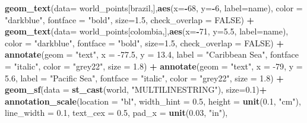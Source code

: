 \documentclass[12pt,twoside]{reedthesis}
\newenvironment{Shaded}{\begin{snugshade}}{\end{snugshade}}
\newcommand{\DataTypeTok}[1]{\textcolor[rgb]{0.13,0.29,0.53}{#1}}
\newcommand{\DecValTok}[1]{\textcolor[rgb]{0.00,0.00,0.81}{#1}}
\newcommand{\FloatTok}[1]{\textcolor[rgb]{0.00,0.00,0.81}{#1}}
\newcommand{\KeywordTok}[1]{\textcolor[rgb]{0.13,0.29,0.53}{\textbf{#1}}}
\newcommand{\NormalTok}[1]{#1}
\newcommand{\OperatorTok}[1]{\textcolor[rgb]{0.81,0.36,0.00}{\textbf{#1}}}
\newcommand{\OtherTok}[1]{\textcolor[rgb]{0.56,0.35,0.01}{#1}}
\newcommand{\StringTok}[1]{\textcolor[rgb]{0.31,0.60,0.02}{#1}}
\begin{document}
\begin{Shaded}
\begin{Highlighting}[]
\StringTok{  }\KeywordTok{geom_text}\NormalTok{(}\DataTypeTok{data=}\NormalTok{ world_points[brazil,],}\KeywordTok{aes}\NormalTok{(}\DataTypeTok{x=}\OperatorTok{-}\DecValTok{68}\NormalTok{, }\DataTypeTok{y=}\OperatorTok{-}\DecValTok{6}\NormalTok{, }\DataTypeTok{label=}\NormalTok{name), }\DataTypeTok{color =} \StringTok{"darkblue"}\NormalTok{, }\DataTypeTok{fontface =} \StringTok{"bold"}\NormalTok{, }\DataTypeTok{size=}\FloatTok{1.5}\NormalTok{, }\DataTypeTok{check_overlap =} \OtherTok{FALSE}\NormalTok{) }\OperatorTok{+}
\StringTok{  }\KeywordTok{geom_text}\NormalTok{(}\DataTypeTok{data=}\NormalTok{ world_points[colombia,],}\KeywordTok{aes}\NormalTok{(}\DataTypeTok{x=}\OperatorTok{-}\DecValTok{71}\NormalTok{, }\DataTypeTok{y=}\FloatTok{5.5}\NormalTok{, }\DataTypeTok{label=}\NormalTok{name), }\DataTypeTok{color =} \StringTok{"darkblue"}\NormalTok{, }\DataTypeTok{fontface =} \StringTok{"bold"}\NormalTok{, }\DataTypeTok{size=}\FloatTok{1.5}\NormalTok{, }\DataTypeTok{check_overlap =} \OtherTok{FALSE}\NormalTok{) }\OperatorTok{+}
\StringTok{  }\KeywordTok{annotate}\NormalTok{(}\DataTypeTok{geom =} \StringTok{"text"}\NormalTok{, }\DataTypeTok{x =} \FloatTok{-77.5}\NormalTok{, }\DataTypeTok{y =} \FloatTok{13.4}\NormalTok{, }\DataTypeTok{label =} \StringTok{"Caribbean Sea"}\NormalTok{, }\DataTypeTok{fontface =} \StringTok{"italic"}\NormalTok{, }\DataTypeTok{color =} \StringTok{"grey22"}\NormalTok{, }\DataTypeTok{size =} \FloatTok{1.8}\NormalTok{) }\OperatorTok{+}\StringTok{ }
\StringTok{  }\KeywordTok{annotate}\NormalTok{(}\DataTypeTok{geom =} \StringTok{"text"}\NormalTok{, }\DataTypeTok{x =} \DecValTok{-79}\NormalTok{, }\DataTypeTok{y =} \FloatTok{5.6}\NormalTok{, }\DataTypeTok{label =} \StringTok{"Pacific Sea"}\NormalTok{, }\DataTypeTok{fontface =} \StringTok{"italic"}\NormalTok{, }\DataTypeTok{color =} \StringTok{"grey22"}\NormalTok{, }\DataTypeTok{size =} \FloatTok{1.8}\NormalTok{) }\OperatorTok{+}
\StringTok{  }\KeywordTok{geom_sf}\NormalTok{(}\DataTypeTok{data =} \KeywordTok{st_cast}\NormalTok{(world, }\StringTok{"MULTILINESTRING"}\NormalTok{), }\DataTypeTok{size=}\FloatTok{0.1}\NormalTok{)}\OperatorTok{+}
\StringTok{  }\KeywordTok{annotation_scale}\NormalTok{(}\DataTypeTok{location =} \StringTok{"bl"}\NormalTok{, }\DataTypeTok{width_hint =} \FloatTok{0.5}\NormalTok{, }\DataTypeTok{height =} \KeywordTok{unit}\NormalTok{(}\FloatTok{0.1}\NormalTok{, }\StringTok{"cm"}\NormalTok{), }\DataTypeTok{line_width =} \FloatTok{0.1}\NormalTok{, }\DataTypeTok{text_cex =} \FloatTok{0.5}\NormalTok{, }\DataTypeTok{pad_x =} \KeywordTok{unit}\NormalTok{(}\FloatTok{0.03}\NormalTok{, }\StringTok{"in"}\NormalTok{), }

\end{Highlighting}
\end{Shaded}
\end{document}
